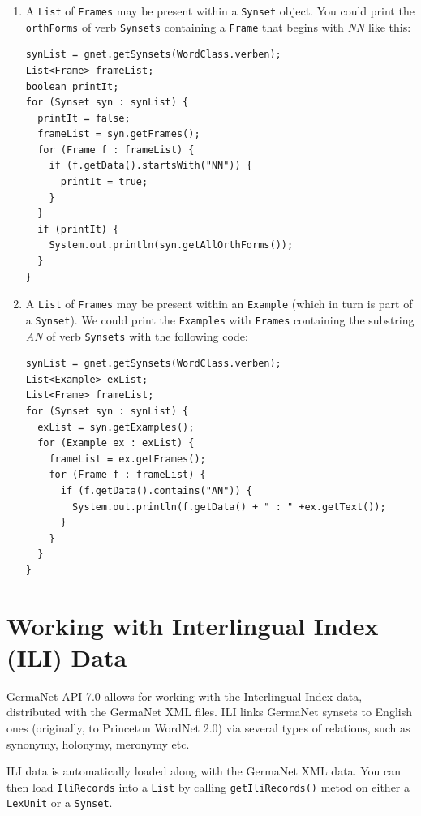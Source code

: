 \documentclass[12pt,a4paper,english,utf8]{report}
\begin{document}
\renewcommand{\labelenumi}{\arabic{enumi}}
\begin{enumerate}
	\item A \texttt{List} of \texttt{Frames} may be present within a \texttt{Synset} object. You could print the \texttt{orthForms} of verb \texttt{Synsets} containing a \texttt{Frame} that begins with \emph{NN} like this:
	
\begin{lstlisting}
synList = gnet.getSynsets(WordClass.verben);
List<Frame> frameList;
boolean printIt;
for (Synset syn : synList) {
  printIt = false;
  frameList = syn.getFrames();
  for (Frame f : frameList) {
    if (f.getData().startsWith("NN")) {
      printIt = true;
    }
  }
  if (printIt) {
    System.out.println(syn.getAllOrthForms());
  }
}
\end{lstlisting}

\item A \texttt{List} of \texttt{Frames} may be present within an \texttt{Example} (which in turn is part of a \texttt{Synset}). We could print the \texttt{Examples} with \texttt{Frames} containing the substring \emph{AN} of verb \texttt{Synsets} with the following code:

\begin{lstlisting}
synList = gnet.getSynsets(WordClass.verben);
List<Example> exList;
List<Frame> frameList;
for (Synset syn : synList) {
  exList = syn.getExamples();
  for (Example ex : exList) {
    frameList = ex.getFrames();
    for (Frame f : frameList) {
      if (f.getData().contains("AN")) {
        System.out.println(f.getData() + " : " +ex.getText());
      }
    }
  }
}
\end{lstlisting}

\end{enumerate}



\section{Working with Interlingual Index (ILI) Data}
GermaNet-API 7.0 allows for working with the Interlingual Index data, distributed with the GermaNet XML files. ILI links GermaNet synsets to English ones (originally, to Princeton WordNet 2.0) via several types of relations, such as synonymy, holonymy, meronymy etc. 

ILI data is automatically loaded along with the GermaNet XML data. You can then load \texttt{IliRecords} into a \texttt{List} by calling \texttt{getIliRecords()} metod on either a \texttt{LexUnit} or a \texttt{Synset}. 
\end{document}
